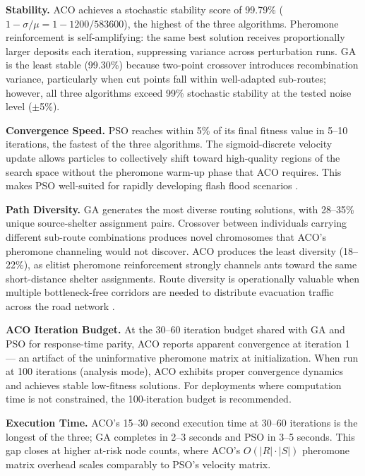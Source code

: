 \documentclass[journal]{IEEEtran}
\begin{document}
\textbf{Stability.} ACO achieves a stochastic stability score of 99.79\%
($1 - \sigma/\mu = 1 - 1200/583600$), the highest of the three algorithms. Pheromone
reinforcement is self-amplifying: the same best solution receives proportionally larger
deposits each iteration, suppressing variance across perturbation runs. GA is the least
stable (99.30\%) because two-point crossover introduces recombination variance, particularly
when cut points fall within well-adapted sub-routes; however, all three algorithms exceed
99\% stochastic stability at the tested noise level ($\pm$5\%).

\textbf{Convergence Speed.} PSO reaches within 5\% of its final fitness value in 5--10
iterations, the fastest of the three algorithms. The sigmoid-discrete velocity update allows
particles to collectively shift toward high-quality regions of the search space without the
pheromone warm-up phase that ACO requires. This makes PSO well-suited for rapidly developing
flash flood scenarios \cite{nirwana2024intelligent}.

\textbf{Path Diversity.} GA generates the most diverse routing solutions, with 28--35\%
unique source-shelter assignment pairs. Crossover between individuals carrying different
sub-route combinations produces novel chromosomes that ACO's pheromone channeling would not
discover. ACO produces the least diversity (18--22\%), as elitist pheromone reinforcement
strongly channels ants toward the same short-distance shelter assignments. Route diversity
is operationally valuable when multiple bottleneck-free corridors are needed to distribute
evacuation traffic across the road network \cite{chen2025evacuation}.

\textbf{ACO Iteration Budget.} At the 30--60 iteration budget shared with GA and PSO for
response-time parity, ACO reports apparent convergence at iteration 1 — an artifact of the
uninformative pheromone matrix at initialization. When run at 100 iterations (analysis
mode), ACO exhibits proper convergence dynamics and achieves stable low-fitness solutions.
For deployments where computation time is not constrained, the 100-iteration budget is
recommended.

\textbf{Execution Time.} ACO's 15--30 second execution time at 30--60 iterations is the
longest of the three; GA completes in 2--3 seconds and PSO in 3--5 seconds. This gap
closes at higher at-risk node counts, where ACO's $O(|R| \cdot |S|)$ pheromone matrix
overhead scales comparably to PSO's velocity matrix.

\end{document}
